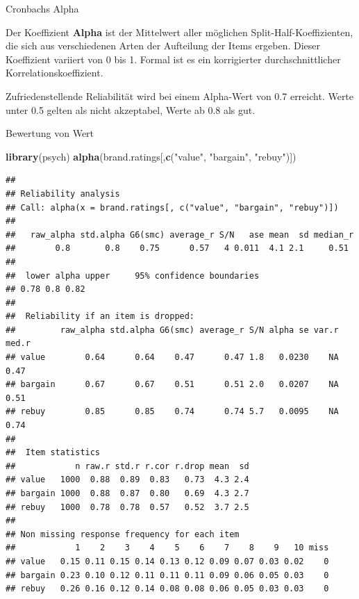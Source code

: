 \documentclass[12pt,ngerman,a4paper,ignorenonframetext,]{beamer}
\newenvironment{Shaded}{\begin{snugshade}}{\end{snugshade}}
\newcommand{\KeywordTok}[1]{\textcolor[rgb]{0.13,0.29,0.53}{\textbf{#1}}}
\newcommand{\NormalTok}[1]{#1}
\newcommand{\StringTok}[1]{\textcolor[rgb]{0.31,0.60,0.02}{#1}}
\begin{document}
\begin{frame}{Cronbachs Alpha}
\protect\hypertarget{cronbachs-alpha}{}

Der Koeffizient \textbf{Alpha} ist der Mittelwert aller möglichen
Split-Half-Koeffizienten, die sich aus verschiedenen Arten der
Aufteilung der Items ergeben. Dieser Koeffizient variiert von 0 bis 1.
Formal ist es ein korrigierter durchschnittlicher
Korrelationskoeffizient.

Zufriedenstellende Reliabilität wird bei einem Alpha-Wert von 0.7
erreicht. Werte unter 0.5 gelten als nicht akzeptabel, Werte ab 0.8 als
gut.

\end{frame}

\begin{frame}{Bewertung von Wert}
\protect\hypertarget{bewertung-von-wert}{}

\begin{Shaded}
\begin{Highlighting}[]
\KeywordTok{library}\NormalTok{(psych)}
\KeywordTok{alpha}\NormalTok{(brand.ratings[,}\KeywordTok{c}\NormalTok{(}\StringTok{"value"}\NormalTok{, }\StringTok{"bargain"}\NormalTok{, }\StringTok{"rebuy"}\NormalTok{)])}
\end{Highlighting}
\end{Shaded}

\begin{verbatim}
## 
## Reliability analysis   
## Call: alpha(x = brand.ratings[, c("value", "bargain", "rebuy")])
## 
##   raw_alpha std.alpha G6(smc) average_r S/N   ase mean  sd median_r
##        0.8       0.8    0.75      0.57   4 0.011  4.1 2.1     0.51
## 
##  lower alpha upper     95% confidence boundaries
## 0.78 0.8 0.82 
## 
##  Reliability if an item is dropped:
##         raw_alpha std.alpha G6(smc) average_r S/N alpha se var.r med.r
## value        0.64      0.64    0.47      0.47 1.8   0.0230    NA  0.47
## bargain      0.67      0.67    0.51      0.51 2.0   0.0207    NA  0.51
## rebuy        0.85      0.85    0.74      0.74 5.7   0.0095    NA  0.74
## 
##  Item statistics 
##            n raw.r std.r r.cor r.drop mean  sd
## value   1000  0.88  0.89  0.83   0.73  4.3 2.4
## bargain 1000  0.88  0.87  0.80   0.69  4.3 2.7
## rebuy   1000  0.78  0.78  0.57   0.52  3.7 2.5
## 
## Non missing response frequency for each item
##            1    2    3    4    5    6    7    8    9   10 miss
## value   0.15 0.11 0.15 0.14 0.13 0.12 0.09 0.07 0.03 0.02    0
## bargain 0.23 0.10 0.12 0.11 0.11 0.11 0.09 0.06 0.05 0.03    0
## rebuy   0.26 0.16 0.12 0.14 0.08 0.08 0.06 0.05 0.03 0.03    0
\end{verbatim}

\end{frame}
\end{document}
